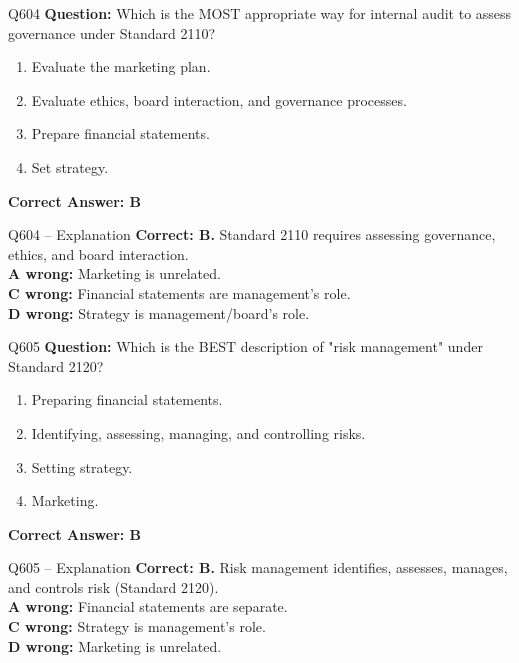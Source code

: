 \documentclass[aspectratio=169,10pt]{beamer}
\begin{document}
	\begin{frame}[t]{Q604}
		\small
		\textbf{Question:} Which is the MOST appropriate way for internal audit to assess governance under Standard 2110?
		\begin{enumerate}[label=\Alph*.,itemsep=1pt,topsep=2pt]
			\item Evaluate the marketing plan.
			\item Evaluate ethics, board interaction, and governance processes.
			\item Prepare financial statements.
			\item Set strategy.
		\end{enumerate}
		\vspace{4pt}
		\textbf{Correct Answer: B}
	\end{frame}
	
	\begin{frame}[t]{Q604 -- Explanation}
		\small
		\textbf{Correct: B.} Standard 2110 requires assessing governance, ethics, and board interaction. \\[4pt]
		\textbf{A wrong:} Marketing is unrelated. \\[2pt]
		\textbf{C wrong:} Financial statements are management's role. \\[2pt]
		\textbf{D wrong:} Strategy is management/board's role.
	\end{frame}
	
	\begin{frame}[t]{Q605}
		\small
		\textbf{Question:} Which is the BEST description of "risk management" under Standard 2120?
		\begin{enumerate}[label=\Alph*.,itemsep=1pt,topsep=2pt]
			\item Preparing financial statements.
			\item Identifying, assessing, managing, and controlling risks.
			\item Setting strategy.
			\item Marketing.
		\end{enumerate}
		\vspace{4pt}
		\textbf{Correct Answer: B}
	\end{frame}
	
	\begin{frame}[t]{Q605 -- Explanation}
		\small
		\textbf{Correct: B.} Risk management identifies, assesses, manages, and controls risk (Standard 2120). \\[4pt]
		\textbf{A wrong:} Financial statements are separate. \\[2pt]
		\textbf{C wrong:} Strategy is management's role. \\[2pt]
		\textbf{D wrong:} Marketing is unrelated.
	\end{frame}
	
\end{document}
